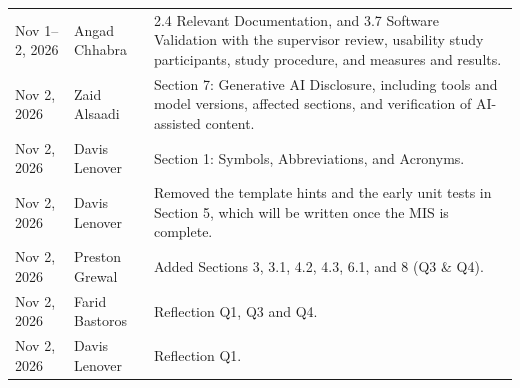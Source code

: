 \documentclass[12pt, titlepage]{article}
\begin{document}
\begin{xltabular}{\textwidth}{llX}
Nov 1--2, 2026 & Angad Chhabra & 2.4 Relevant Documentation, and 3.7 Software
  Validation with the supervisor review, usability study participants, study
  procedure, and measures and results.\\
Nov 2, 2026 & Zaid Alsaadi & Section 7: Generative AI Disclosure, including tools and model versions, affected sections, and verification of AI-assisted content.\\
Nov 2, 2026 & Davis Lenover & Section 1: Symbols, Abbreviations, and Acronyms.\\
Nov 2, 2026 & Davis Lenover & Removed the template hints and the early unit
  tests in Section 5, which will be written once the MIS is complete.\\
Nov 2, 2026 & Preston Grewal & Added Sections 3, 3.1, 4.2, 4.3, 6.1, and 8 (Q3 \& Q4). \\
Nov 2, 2026 & Farid Bastoros & Reflection Q1, Q3 and Q4.\\
Nov 2, 2026 & Davis Lenover & Reflection Q1.\\
\bottomrule
\end{xltabular}



\newpage

\tableofcontents

\listoftables


\newpage
\end{document}
